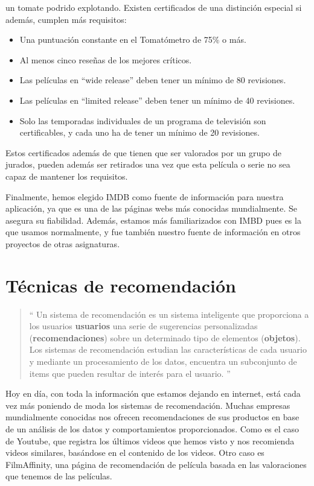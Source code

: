 \begin{itemize}
     un tomate podrido explotando.
    Existen certificados de una distinción especial si además, cumplen más
     requisitos:
     \begin{itemize}
         \item Una puntuación constante en el Tomatómetro de 75\% o más.
         \item Al menos cinco reseñas de los mejores críticos.
         \item Las películas en ``wide release'' deben tener un mínimo de 80 revisiones.
         \item Las películas en ``limited release'' deben tener un mínimo de 40 revisiones.
         \item Solo las temporadas individuales de un programa de televisión son certificables, y cada uno ha de tener un mínimo de 20 revisiones.
     \end{itemize}
    Estos certificados además de que tienen que ser valorados por un grupo de jurados, pueden además ser retirados una vez que esta película o serie
    no sea capaz de mantener los requisitos.
\end{itemize}

Finalmente, hemos elegido IMDB como fuente de información para nuestra aplicación, ya que es una de las páginas webs más conocidas mundialmente. Se asegura su fiabilidad.
Además, estamos más familiarizados con IMBD pues es la que usamos normalmente, y fue también nuestro fuente de información en otros proyectos de otras asignaturas.

\section{Técnicas de recomendación}
\label{makereference2.3}

\begin{quote}
``
Un sistema de recomendación es un sistema inteligente que proporciona a los usuarios \textbf{usuarios} una serie de 
sugerencias personalizadas (\textbf{recomendaciones}) sobre un determinado tipo de elementos (\textbf{objetos}). Los 
sistemas de recomendación estudian las características de cada usuario y mediante un procesamiento 
de los datos, encuentra un subconjunto de items que pueden resultar de interés para el usuario. 
''
\end{quote}

Hoy en día, con toda la información que estamos dejando en internet, está cada vez más poniendo de moda los sistemas de recomendación.
Muchas empresas mundialmente conocidas nos ofrecen recomendaciones de sus productos en base de un análisis de los datos y comportamientos proporcionados.
Como es el caso de Youtube, que registra los últimos videos que hemos visto y nos recomienda videos similares, basándose en el contenido de los videos. Otro caso es FilmAffinity, 
una página de recomendación de película basada en las valoraciones que tenemos de las películas.

